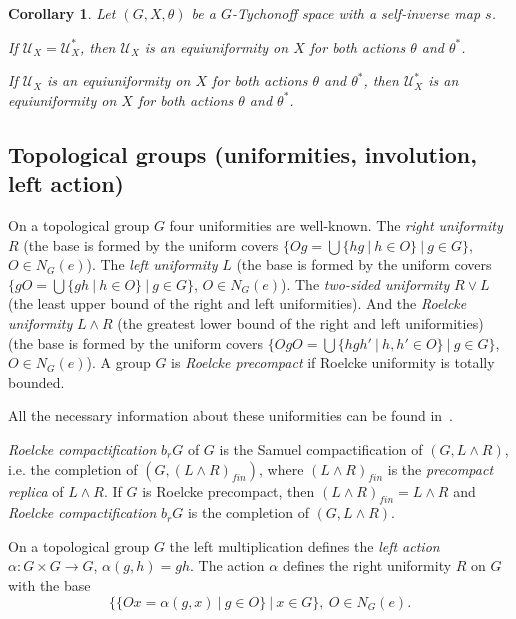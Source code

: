\documentclass{amsart}
\newtheorem{cor}[thm]{Corollary}
\begin{document}
\begin{cor}
Let $(G, X, \theta)$ be a $G$-Tychonoff space with a self-inverse map $s$. 

If $\mathcal U_X=\mathcal U^*_X$, then $\mathcal U_X$ is an equiuniformity on $X$ for both actions $\theta$ and $\theta^*$.

If  $\mathcal U_X$ is an equiuniformity on $X$ for both actions $\theta$ and $\theta^*$, then $\mathcal U^*_X$ is  an equiuniformity on $X$ for both actions  $\theta$ and $\theta^*$.
\end{cor}


\subsection{Topological groups (uniformities, involution, left action)}
On a topological group $G$ four uniformities are well-known. The {\it right uniformity} $R$ (the base is formed by the uniform covers $\{Og=\bigcup\{hg\ |\ h\in O\}\ |\ g\in G\}$, $O\in N_G(e)$). The {\it left uniformity} $L$ (the base is formed by the uniform covers $\{gO=\bigcup\{gh\ |\ h\in O\}\ |\ g\in G\}$, $O\in N_G(e)$).  The {\it two-sided uniformity} $R\vee L$ (the least upper bound of the right and left uniformities). And the {\it Roelcke uniformity} $L\wedge R$ (the greatest lower bound of the right and left uniformities) (the base is formed by the uniform covers $\{OgO=\bigcup\{hgh'\ |\ h, h'\in O\}\ |\ g\in G\}$, $O\in N_G(e)$). A group  $G$ is {\it Roelcke precompact} if Roelcke uniformity is totally bounded. 

All the necessary information about these uniformities can be found in~\cite{RD}. 

{\it Roelcke compactification} $b_r G$ of $G$ is the Samuel compactification of $(G, L\wedge R)$, i.e. the completion of $(G, (L\wedge R)_{fin})$, where $(L\wedge R)_{fin}$ is the {\it precompact replica} of $L\wedge R$. If $G$ is Roelcke precompact, then $(L\wedge R)_{fin}=L\wedge R$ and {\it Roelcke compactification} $b_r G$ is the completion of $(G, L\wedge R)$.

\medskip 

On a topological group $G$ the left multiplication defines the {\it left action} $\alpha: G\times G\to G$, $\alpha (g , h)=gh$. The action $\alpha$ defines the right uniformity $R$ on $G$ with the base 
$$\{\{Ox=\alpha (g, x)\ |\  g\in O\}\ |\  x\in G\},\ O\in N_G(e).$$
\end{document}
